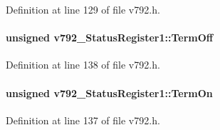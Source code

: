 Definition at line 129 of file v792.h.
\paragraph[{TermOff}]{\setlength{\rightskip}{0pt plus 5cm}unsigned {\bf v792\_\-StatusRegister1::TermOff}}\hfill\label{unionv792__StatusRegister1_a7c24a67d726f10ee187bcb8c9cdad78e}


Definition at line 138 of file v792.h.
\paragraph[{TermOn}]{\setlength{\rightskip}{0pt plus 5cm}unsigned {\bf v792\_\-StatusRegister1::TermOn}}\hfill\label{unionv792__StatusRegister1_af0439db7fff978b57b4fc69d75d5b745}


Definition at line 137 of file v792.h.